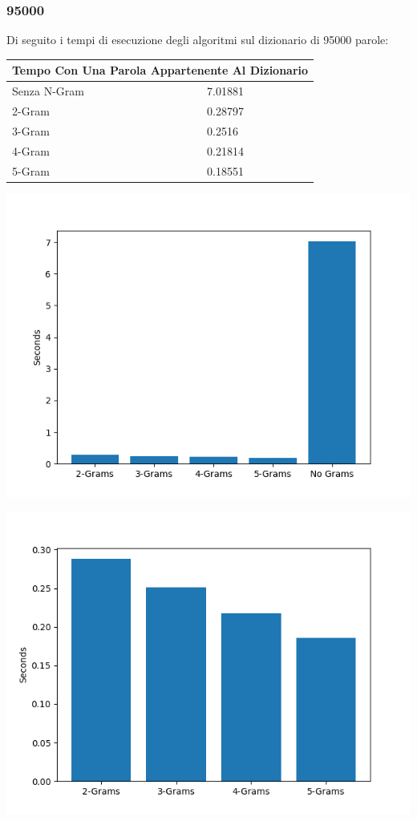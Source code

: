 \documentclass{article}
\begin{document}
\subsubsection{95000}
Di seguito i tempi di esecuzione degli algoritmi sul dizionario di 95000 parole:
\medskip

\begin{tabular}{ |p{3cm}||p{3.5cm}|  }
 \hline
 \multicolumn{2}{|c|}{Tempo Con Una Parola Appartenente Al Dizionario} \\
\hline
 Senza N-Gram  &   7.01881\\\hline
 2-Gram &  0.28797   \\\hline
 3-Gram & 0.2516 \\\hline
 4-Gram & 0.21814\\\hline
 5-Gram & 0.18551  \\
 \hline
\end{tabular}

\includegraphics[scale=0.5]{img/ParolaNonModificata_95000_parole.png}

\includegraphics[scale=0.5]{img/ParolaNonModificataSoloGram_95000_parole.png}
\end{document}
